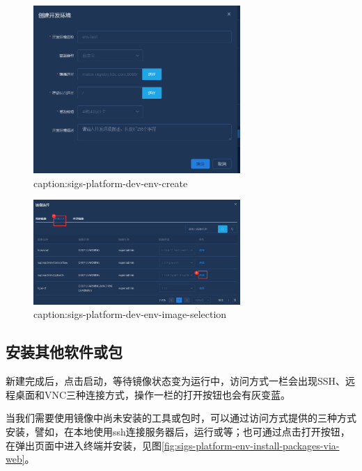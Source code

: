 \begin{figure}[htbp]
	\centering
	\includegraphics[width=0.7\textwidth]{figures/sigs-platform-dev-env-create.png}
	\caption{caption:sigs-platform-dev-env-create}
	\label{fig:sigs-platform-dev-env-create}
\end{figure}

\begin{figure}[htbp]
	\centering
	\includegraphics[width=0.7\textwidth]{figures/sigs-platform-dev-env-image-selection.png}
	\caption{caption:sigs-platform-dev-env-image-selection}
	\label{fig:sigs-platform-dev-env-image-selection}
\end{figure}

\subsection{安装其他软件或包}

新建完成后，点击启动，等待镜像状态变为运行中，访问方式一栏会出现SSH、远程桌面和VNC三种连接方式，操作一栏的打开按钮也会有灰变蓝。

当我们需要使用镜像中尚未安装的工具或包时，可以通过访问方式提供的三种方式安装，譬如，在本地使用ssh连接服务器后，运行或等；也可通过点击打开按钮，在弹出页面中进入终端并安装，见图\ref{fig:sigs-platform-env-install-packages-via-web}。

